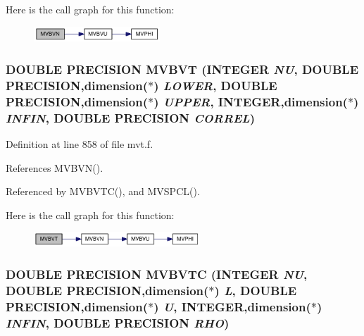 Here is the call graph for this function:\nopagebreak
\begin{figure}[H]
\begin{center}
\leavevmode
\includegraphics[width=134pt]{mvt_8f_01b86430a337d3d8b91bcf9346d7dd3b_cgraph}
\end{center}
\end{figure}
\hypertarget{mvt_8f_9d0fae33894aee91124b4f3695494f7e}{
\subsubsection[{MVBVT}]{\setlength{\rightskip}{0pt plus 5cm}DOUBLE PRECISION MVBVT (INTEGER {\em NU}, \/  DOUBLE PRECISION,dimension($\ast$) {\em LOWER}, \/  DOUBLE PRECISION,dimension($\ast$) {\em UPPER}, \/  INTEGER,dimension($\ast$) {\em INFIN}, \/  DOUBLE PRECISION {\em CORREL})}}
\label{mvt_8f_9d0fae33894aee91124b4f3695494f7e}




Definition at line 858 of file mvt.f.

References MVBVN().

Referenced by MVBVTC(), and MVSPCL().

Here is the call graph for this function:\nopagebreak
\begin{figure}[H]
\begin{center}
\leavevmode
\includegraphics[width=177pt]{mvt_8f_9d0fae33894aee91124b4f3695494f7e_cgraph}
\end{center}
\end{figure}
\hypertarget{mvt_8f_597ed59b5410765b8afcc6527c9552e7}{
\subsubsection[{MVBVTC}]{\setlength{\rightskip}{0pt plus 5cm}DOUBLE PRECISION MVBVTC (INTEGER {\em NU}, \/  DOUBLE PRECISION,dimension($\ast$) {\em L}, \/  DOUBLE PRECISION,dimension($\ast$) {\em U}, \/  INTEGER,dimension($\ast$) {\em INFIN}, \/  DOUBLE PRECISION {\em RHO})}}
\label{mvt_8f_597ed59b5410765b8afcc6527c9552e7}




